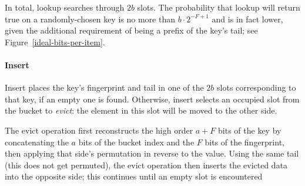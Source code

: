 \documentclass[letterpaper,twocolumn,10pt]{article}
\newcommand{\TCF}{SCF}
\newcommand{\TCF}{TCF}
\begin{document}



In total, lookup searches through $2b$ slots.
The probability that lookup will return true on a randomly-chosen key is no more than $b\cdot2^{-F+1}$ and is in fact lower, given the additional requirement of being a prefix of the key's tail; see Figure~\ref{ideal-bits-per-item}.

\paragraph{Insert}
Insert places the key's fingerprint and tail in one of the $2b$ slots corresponding to that key, if an empty one is found.
Otherwise, insert selects an occupied slot from the bucket to {\em evict}: the element in this slot will be moved to the other side. %

The evict operation first reconstructs the high order $a + F$ bits of the key by concatenating the $a$ bits of the bucket index and the $F$ bits of the fingerprint, then applying that side's permutation in reverse to the value. %
Using the same tail (this does not get permuted), the evict operation then inserts the evicted data into the opposite side;
this continues until an empty slot is encountered %

\end{document}

